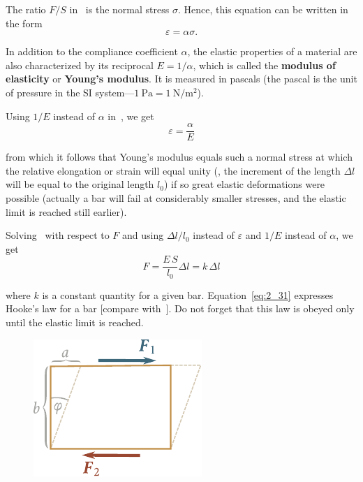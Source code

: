 The ratio $F/S$ in~ is the normal stress $\sigma$. Hence, this equation can be written in the form
\begin{equation}\label{eq:2_29}
\varepsilon = \alpha\sigma.
\end{equation}

\noindent
In addition to the compliance coefficient $\alpha$, the elastic properties of a material are also characterized by its reciprocal $E=1/\alpha$, which is called the \textbf{modulus of elasticity} or \textbf{Young's modulus}. It is measured in pascals (the pascal is the unit of pressure in the SI system---$\SI{1}{\pascal}=\SI{1}{\newton\per\square\metre}$).

Using $1/E$ instead of $\alpha$ in~, we get
\begin{equation}\label{eq:2_30}
\varepsilon = \frac{\alpha}{E}
\end{equation}

\noindent
from which it follows that Young's modulus equals such a normal stress at which the relative elongation or strain will equal unity (\ie, the increment of the length $\Delta l$ will be equal to the original length $l_0$) if so great elastic deformations were possible (actually a bar will fail at considerably smaller stresses, and the elastic limit is reached still earlier).

Solving~ with respect to $F$ and using $\Delta l/l_0$ instead of $\varepsilon$ and $1/E$ instead of $\alpha$, we get
\begin{equation}\label{eq:2_31}
F = \frac{E\,S}{l_0}\Delta l = k\,\Delta l
\end{equation}

\noindent
where $k$ is a constant quantity for a given bar. Equation~\eqref{eq:2_31} expresses Hooke's law for a bar [compare with~]. Do not forget that this law is obeyed only until the elastic limit is reached.

\begin{figure}[t]
	\begin{center}
		\includegraphics[scale=1]{figures/ch_02/fig_2_7.pdf}
		\caption[]{}
		\label{fig:2_7}
	\end{center}
	\vspace{-0.7cm}
\end{figure}

